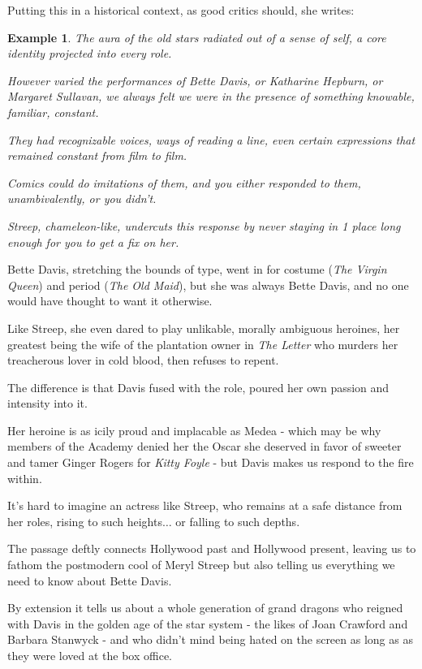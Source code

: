 \documentclass{book}
\numberwithin{equation}{section}
\newtheorem{example}{Example}[chapter]
\begin{document}
Putting this in a historical context, as good critics should, she writes:
\begin{example}
    The aura of the old stars radiated out of a sense of self, a core identity projected into every role.
    
    However varied the performances of Bette Davis, or Katharine Hepburn, or Margaret Sullavan, we always felt we were in the presence of something knowable, familiar, constant.
    
    They had recognizable voices, ways of reading a line, even certain expressions that remained constant from film to film.
    
    Comics could do imitations of them, and you either responded to them, unambivalently, or you didn't.
    
    Streep, chameleon-like, undercuts this response by never staying in 1 place long enough for you to get a fix on her.
\end{example}
Bette Davis, stretching the bounds of type, went in for costume (\textit{The Virgin Queen}) and period (\textit{The Old Maid}), but she was always Bette Davis, and no one would have thought to want it otherwise.

Like Streep, she even dared to play unlikable, morally ambiguous heroines, her greatest being the wife of the plantation owner in \textit{The Letter} who murders her treacherous lover in cold blood, then refuses to repent.

The difference is that Davis fused with the role, poured her own passion and intensity into it.

Her heroine is as icily proud and implacable as Medea - which may be why members of the Academy denied her the Oscar she deserved in favor of sweeter and tamer Ginger Rogers for \textit{Kitty Foyle} - but Davis makes us respond to the fire within.

It's hard to imagine an actress like Streep, who remains at a safe distance from her roles, rising to such heights$\ldots$ or falling to such depths.

%
The passage deftly connects Hollywood past and Hollywood present, leaving us to fathom the postmodern cool of Meryl Streep but also telling us everything we need to know about Bette Davis.

By extension it tells us about a whole generation of grand dragons who reigned with Davis in the golden age of the star system - the likes of Joan Crawford and Barbara Stanwyck - and who didn't mind being hated on the screen as long as as they were loved at the box office.
\end{document}
